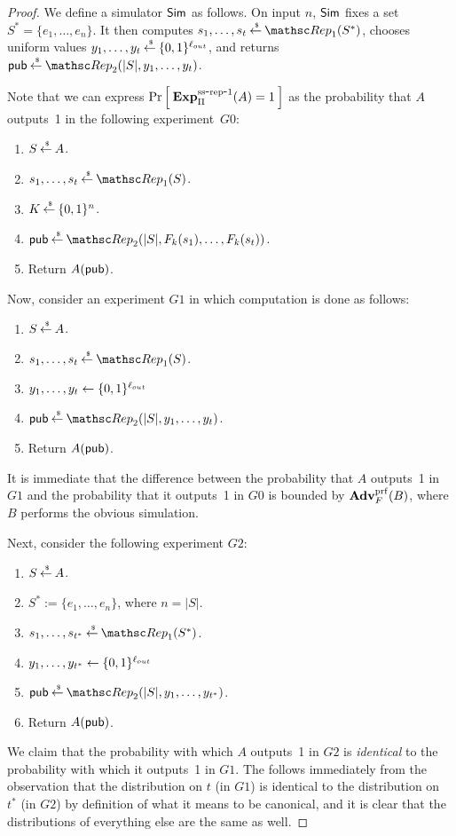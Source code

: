 \begin{proof}
We define a simulator ${\sf Sim}$ as follows. On input $n$, ${\sf Sim}$ fixes
a set $S^*=\{e_1, \ldots, e_n\}$. It then computes $s_1,
\ldots, s_t \getsr \Rep_1(S^*)$, chooses uniform values $y_1, \ldots, y_t {\:\stackrel{{\scriptscriptstyle \hspace{0.2em}\$}} {\leftarrow}\:} \{0,1\}^{\ell_{out}}$,
and returns $\pubaux
\getsr \Rep_2(|S|, y_1, \ldots, y_t)$.

\def\hyb{\mbox{{\sc Hyb}}}

Note that we can express $\Pr\left[\: \mathrm{\mathbf{Exp}}^{\mathrm{ss\mbox{-}rep\mbox{-}1}}_{\Pi}(A)=1 \:\right]$ as the probability that $A$
outputs~1 in
the following experiment~$G0$:
\begin{enumerate}
\item $S {\:\stackrel{{\scriptscriptstyle \hspace{0.2em}\$}} {\leftarrow}\:} A$.
\item $s_1, \ldots, s_t \getsr \Rep_1(S)$.
\item $K {\:\stackrel{{\scriptscriptstyle \hspace{0.2em}\$}} {\leftarrow}\:} \{0,1\}^n$.
\item $\pubaux \getsr \Rep_2(|S|, F_k(s_1), \ldots, F_k(s_t))$.
\item Return $A({\sf pub})$.
\end{enumerate}

Now, consider an experiment $G1$ in which computation is done as follows:
\begin{enumerate}
\item $S {\:\stackrel{{\scriptscriptstyle \hspace{0.2em}\$}} {\leftarrow}\:} A$.
\item $s_1, \ldots, s_t \getsr \Rep_1(S)$.
\item $y_1, \ldots, y_t \leftarrow \{0,1\}^{\ell_{out}}$
\item $\pubaux \getsr \Rep_2(|S|, y_1, \ldots, y_t)$.
\item Return $A({\sf pub})$.
\end{enumerate}
It is immediate that the difference between the probability that $A$ outputs~1 in
$G1$ and the probability that it outputs~1 in
$G0$ is bounded by $\mathbf{Adv}^{\mathrm{prf}}_{F}(B)$, where $B$ performs the
obvious simulation.

Next, consider the following experiment $G2$:
\begin{enumerate}
\item $S {\:\stackrel{{\scriptscriptstyle \hspace{0.2em}\$}} {\leftarrow}\:} A$.
\item $S^* := \{e_1, \ldots, e_n\}$, where $n = |S|$.
\item $s_1, \ldots, s_{t^*} \getsr \Rep_1(S^*)$.
\item $y_1, \ldots, y_{t^*} \leftarrow \{0,1\}^{\ell_{out}}$
\item $\pubaux \getsr \Rep_2(|S|, y_1, \ldots, y_{t^*})$.
\item Return $A({\sf pub})$.
\end{enumerate}
We claim that the probability with which $A$ outputs~1 in $G2$ is \emph{identical} to the
probability with which it outputs~1 in $G1$.
The follows immediately from the
observation that the distribution on $t$ (in $G1$) is identical to the distribution on~$t^*$
(in $G2$) by definition
of what it means to be canonical, and it is clear that the distributions of everything
else are the same as well.


\end{proof}
